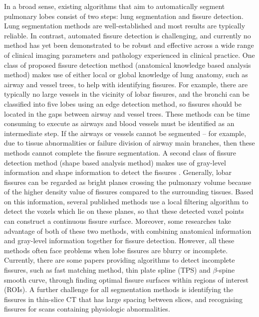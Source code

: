 \documentclass[]{spie}  %
\begin{document}
In a broad sense, existing algorithms that aim to automatically segment pulmonary lobes consist of two steps: lung segmentation and fissure detection. Lung segmentation methods are well-established and most results are typically reliable\cite{hu2001automatic, ukil2005smoothing, sun20063d, pu2008adaptive, wang2009automated, sun2012automated}. In contrast, automated fissure detection is challenging, and currently no method has yet been demonstrated to be robust and effective across a wide range of clinical imaging parameters and pathology experienced in clinical practice. One class of proposed fissure detection method (anatomical knowledge based analysis method) makes use of either local or global knowledge of lung anatomy, such as airway and vessel trees, to help with identifying fissures\cite{kuhnigk2005informatics, zhou2004automatic, saita2006algorithm, ukil2009anatomy, pu2009computational, lassen2010automatic, doel2012pulmonary, lassen2013automatic}. For example, there are typically no large vessels in the vicinity of lobar fissures, and the bronchi can be classified into five lobes using an edge detection method, so fissures should be located in the gaps between airway and vessel trees. These methods can be time consuming to execute as airways and blood vessels must be identified as an intermediate step. If the airways or vessels cannot be segmented – for example, due to tissue abnormalities or failure division of airway main branches, then these methods cannot complete the fissure segmentation. A second class of fissure detection method (shape based analysis method) makes use of gray-level information and shape information to detect the fissures \cite{wiemker2005unsupervised, van2008supervised, van2010automatic, ross2010automatic, kitasaka2006recognition, lassen2011interactive, doel2012pulmonary, lassen2013automatic, ross2013pulmonary}. Generally, lobar fissures can be regarded as bright planes crossing the pulmonary volume because of the higher density value of fissures compared to the surrounding tissues. Based on this information, several published methods use a local filtering algorithm to detect the voxels which lie on these planes, so that these detected voxel points can construct a continuous fissure surface. Moreover, some researches take advantage of both of these two methods, with combining anatomical information and gray-level information together for fissure detection\cite{ukil2009anatomy, doel2012pulmonary, lassen2013automatic}. However, all these methods often face problems when lobe fissures are blurry or incomplete. Currently, there are some papers providing algorithms to detect incomplete fissures, such as fast matching method\cite{ukil2009anatomy}, thin plate spline (TPS)\cite{ross2013pulmonary} and $\beta$-spine smooth curve\cite{doel2012pulmonary}, through finding optimal fissure surfaces within regions of interest (ROIs). A further challenge for all segmentation methods is identifying the fissures in thin-slice CT that has large spacing between slices, and recognising fissures for scans containing physiologic abnormalities.
\end{document}
